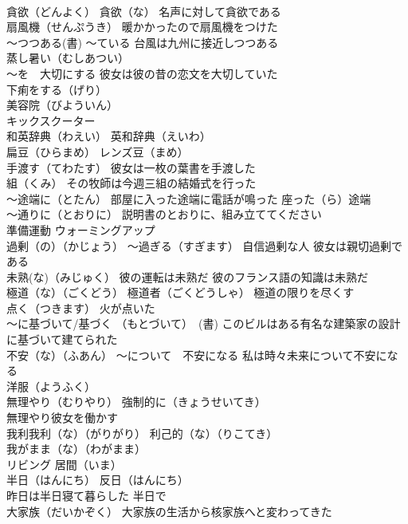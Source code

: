 \documentclass[8pt]{extreport}
\begin{document}
\begin{CJK}{UTF8}{min}
\\	貪欲（どんよく） 貪欲（な） 名声に対して貪欲である
\\	扇風機（せんぷうき） 暖かかったので扇風機をつけた
\\	～つつある(書) ～ている 台風は九州に接近しつつある
\\	蒸し暑い（むしあつい）
\\	～を　大切にする 彼女は彼の昔の恋文を大切していた
\\	下痢をする（げり）
\\	美容院（びよういん）
\\	キックスクーター
\\	和英辞典（わえい） 英和辞典（えいわ）
\\	扁豆（ひらまめ） レンズ豆（まめ）
\\	手渡す（てわたす） 彼女は一枚の葉書を手渡した
\\	組（くみ） その牧師は今週三組の結婚式を行った
\\	～途端に（とたん） 部屋に入った途端に電話が鳴った 座った（ら）途端
\\	～通りに（とおりに） 説明書のとおりに、組み立ててください
\\	準備運動 ウォーミングアップ
\\	過剰（の）（かじょう） ～過ぎる（すぎます） 自信過剰な人 彼女は親切過剰である
\\	未熟(な)（みじゅく） 彼の運転は未熟だ 彼のフランス語の知識は未熟だ
\\	極道（な）（ごくどう） 極道者（ごくどうしゃ） 極道の限りを尽くす
\\	点く（つきます） 火が点いた
\\	～に基づいて/基づく （もとづいて）　(書) このビルはある有名な建築家の設計に基づいて建てられた
\\	不安（な）（ふあん） ～について　不安になる 私は時々未来について不安になる
\\	洋服（ようふく）
\\	無理やり（むりやり） 強制的に（きょうせいてき）
\\	無理やり彼女を働かす
\\	我利我利（な）（がりがり） 利己的（な）（りこてき）
\\	我がまま（な）（わがまま）
\\	リビング 居間（いま）
\\	半日（はんにち） 反日（はんにち）
\\	昨日は半日寝て暮らした 半日で
\\	大家族（だいかぞく） 大家族の生活から核家族へと変わってきた

\end{CJK}
\end{document}

